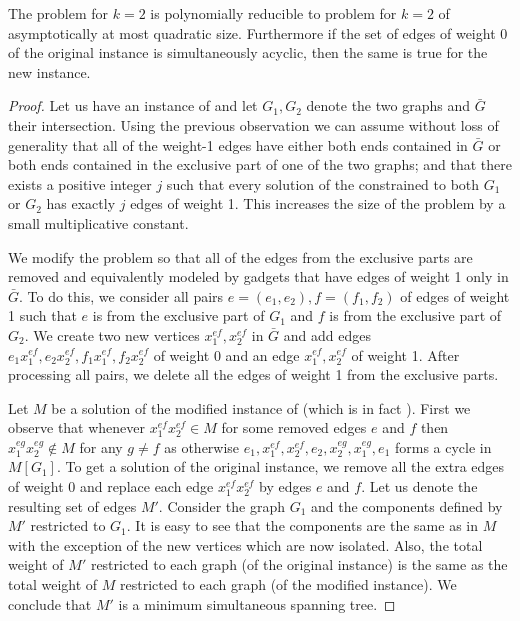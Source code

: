 \begin{lemma}\label{lem:OItoPOI}
The \OISMST problem for $k = 2$ is polynomially reducible to \POISMST problem for $k=2$ of asymptotically at most quadratic size. Furthermore if the set of edges of weight 0 of the original \OISMST instance is simultaneously acyclic, then the same is true for the new \POISMST instance. 
\end{lemma}
\begin{proof}
Let us have an instance of \OISMST and let $G_1,G_2$ denote the two graphs and $\bar{G}$ their intersection. Using the previous observation we can assume without loss of generality that all of the weight-1 edges have either both ends contained in $\bar{G}$ or both ends contained in the exclusive part of one of the two graphs; and that there exists a positive integer $j$ such that every solution of the \OISMST constrained to both $G_1$ or $G_2$ has exactly $j$ edges of weight 1. This increases the size of the problem by a small multiplicative constant. 

We modify the problem so that all of the edges from the exclusive parts are removed and equivalently modeled by gadgets that have edges of weight 1 only in $\bar{G}$. To do this, we consider all pairs $e=(e_1,e_2),f=(f_1,f_2)$ of edges of weight 1 such that $e$ is from the exclusive part of $G_1$ and $f$ is from the exclusive part of $G_2$. We create two new vertices $x^{ef}_1,x^{ef}_2$ in $\bar{G}$ and add edges $e_1x^{ef}_1,e_2x^{ef}_2,f_1x^{ef}_1,f_2x^{ef}_2$ of weight 0 and an edge $x^{ef}_1,x^{ef}_2$ of weight 1. After processing all pairs, we delete all the edges of weight 1 from the exclusive parts. 

Let $M$ be a solution of the modified instance of \OISMST (which is in fact \POISMST). First we observe that whenever $x^{ef}_1x^{ef}_2 \in M$ for some removed edges $e$ and $f$ then $x^{eg}_1x^{eg}_2 \notin M$ for any $g \neq f$ as otherwise $e_1,x^{ef}_1,x^{ef}_2,e_2,x^{eg}_2,x^{eg}_1,e_1$ forms a cycle in $M[G_1]$. To get a solution of the original instance, we remove all the extra edges of weight 0 and replace each edge $x^{ef}_1x^{ef}_2$ by edges $e$ and $f$. Let us denote the resulting set of edges $M'$. Consider the graph $G_1$ and the components defined by $M'$ restricted to $G_1$. It is easy to see that the components are the same as in $M$ with the exception of the new vertices which are now isolated. Also, the total weight of $M'$ restricted to each graph (of the original instance) is the same as the total weight of $M$ restricted to each graph (of the modified instance). We conclude that $M'$ is a minimum simultaneous spanning tree.


\end{proof}
